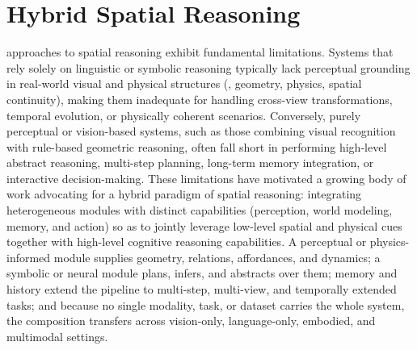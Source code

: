 \section{Hybrid Spatial Reasoning}
\label{sec:p3_s7_4}

 approaches to spatial reasoning exhibit fundamental limitations.
Systems that rely solely on linguistic or symbolic reasoning typically lack perceptual grounding in real-world visual and physical structures (\eg, geometry, physics, spatial continuity), making them inadequate for handling cross-view transformations, temporal evolution, or physically coherent scenarios.
Conversely, purely perceptual or vision-based systems, such as those combining visual recognition with rule-based geometric reasoning, often fall short in performing high-level abstract reasoning, multi-step planning, long-term memory integration, or interactive decision-making.
These limitations have motivated a growing body of work advocating for a hybrid paradigm of spatial reasoning: integrating heterogeneous modules with distinct capabilities (perception, world modeling, memory, and action) so as to jointly leverage low-level spatial and physical cues together with high-level cognitive reasoning capabilities.
A perceptual or physics-informed module supplies geometry, relations, affordances, and dynamics; a symbolic or neural module plans, infers, and abstracts over them; memory and history extend the pipeline to multi-step, multi-view, and temporally extended tasks; and because no single modality, task, or dataset carries the whole system, the composition transfers across vision-only, language-only, embodied, and multimodal settings.



